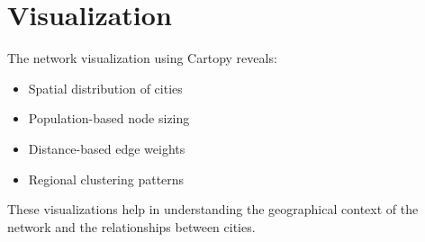 \section{Visualization}
The network visualization using Cartopy reveals:
\begin{itemize}
    \item Spatial distribution of cities
    \item Population-based node sizing
    \item Distance-based edge weights
    \item Regional clustering patterns
\end{itemize}

These visualizations help in understanding the geographical context of the network and the relationships between cities. 